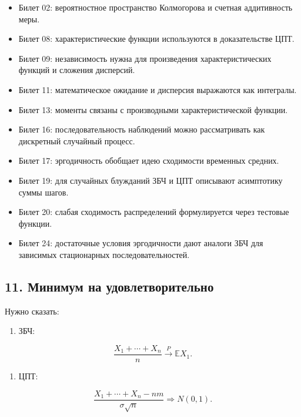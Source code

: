 \documentclass[
  11pt,
  a4paper,
]{article}
\providecommand{\tightlist}{%
  \setlength{\itemsep}{0pt}\setlength{\parskip}{0pt}}
\begin{document}
\begin{itemize}
\tightlist
\item
  Билет 02: вероятностное пространство Колмогорова и счетная
  аддитивность меры.
\item
  Билет 08: характеристические функции используются в доказательстве
  ЦПТ.
\item
  Билет 09: независимость нужна для произведения характеристических
  функций и сложения дисперсий.
\item
  Билет 11: математическое ожидание и дисперсия выражаются как
  интегралы.
\item
  Билет 13: моменты связаны с производными характеристической функции.
\item
  Билет 16: последовательность наблюдений можно рассматривать как
  дискретный случайный процесс.
\item
  Билет 17: эргодичность обобщает идею сходимости временных средних.
\item
  Билет 19: для случайных блужданий ЗБЧ и ЦПТ описывают асимптотику
  суммы шагов.
\item
  Билет 20: слабая сходимость распределений формулируется через тестовые
  функции.
\item
  Билет 24: достаточные условия эргодичности дают аналоги ЗБЧ для
  зависимых стационарных последовательностей.
\end{itemize}

\subsection{11. Минимум на
удовлетворительно}\label{ux43cux438ux43dux438ux43cux443ux43c-ux43dux430-ux443ux434ux43eux432ux43bux435ux442ux432ux43eux440ux438ux442ux435ux43bux44cux43dux43e}

Нужно сказать:

\begin{enumerate}
\def\labelenumi{\arabic{enumi}.}
\tightlist
\item
  ЗБЧ:
\end{enumerate}

\[
\frac{X_1+\cdots+X_n}{n}\xrightarrow{P}\mathbb EX_1.
\]

\begin{enumerate}
\def\labelenumi{\arabic{enumi}.}
\setcounter{enumi}{1}
\tightlist
\item
  ЦПТ:
\end{enumerate}

\[
\frac{X_1+\cdots+X_n-nm}{\sigma\sqrt n}
\Rightarrow
N(0,1).
\]
\end{document}
